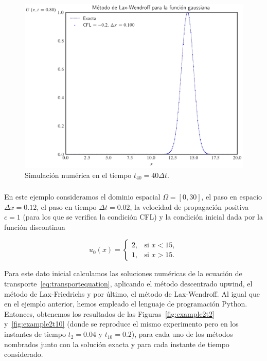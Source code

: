 \begin{frame}
\begin{figure}[ht!]
        \includegraphics[width=.30\paperwidth]{../snapshots/lax-wendroffgaussiana1d-40.png}
        \caption{Simulación numérica en el tiempo $t_{40}=40\Delta t$.}
        \label{fig:example1t40}
    \end{figure}
\end{frame}

\begin{frame}
    \frametitle{\secname}
    \begin{example}
        En este ejemplo consideramos el dominio espacial
        $\Omega=\left[0,30\right]$, el paso en espacio $\Delta x=0.12$, el
        paso en tiempo $\Delta t=0.02$, la velocidad de propagación positiva
        $c=1$ (para los que se verifica la condición CFL) y la condición
        inicial dada por la función discontinua

        \begin{equation*}
            u_{0}\left(x\right)=
            \begin{cases}
                2, & \text{si }x<15, \\
                1, & \text{si }x>15.
            \end{cases}
        \end{equation*}

        Para este dato inicial calculamos las soluciones numéricas de la
        ecuación de transporte~\eqref{eq:transportequation}, aplicando el
        método descentrado upwind, el método de Lax-Friedrichs y por último,
        el método de Lax-Wendroff.
        Al igual que en el ejemplo anterior, hemos empleado el lenguaje de
        programación Python.
        Entonces, obtenemos los resultados de las
        Figuras~\ref{fig:example2t2} y~\ref{fig:example2t10} (donde se
        reproduce el mismo experimento pero en los instantes de tiempo
        $t_{2}=0.04$ y $t_{10}=0.2$), para cada uno de los métodos nombrados
        junto con la solución exacta y para cada instante de tiempo
        considerado.
    \end{example}
\end{frame}

